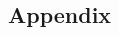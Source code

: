 \documentclass[letterpaper,12pt]{article}
\begin{document}
\begin{thebibliography}{99}
%
%
%
%
%
%
%
%
%
%
%
%
%
%

\end{thebibliography}

\begin{appendices}
\section{Appendix}
\end{appendices}
\end{document}
